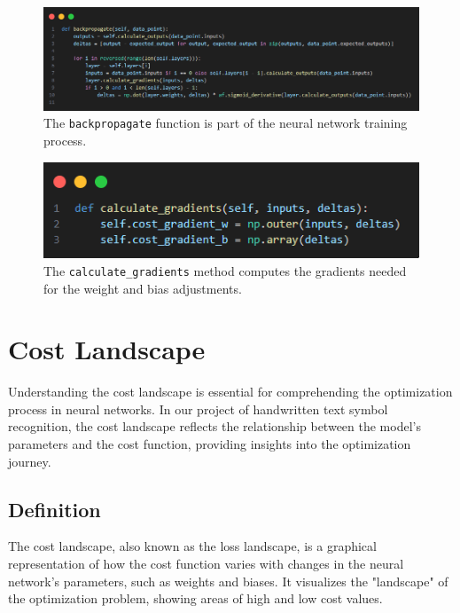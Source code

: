 \documentclass{article}
\begin{document}
\begin{figure}[ht]
    \centering 
    \includegraphics[width=1\textwidth]{images/backpropagate.png}
    \caption{The \texttt{backpropagate} function is part of the neural network training process.}
    \label{fig:backpropagation}
\end{figure}

\begin{figure}[ht]
    \centering 
    \includegraphics[width=1\textwidth]{images/calculate-gradients.png}
    \caption{The \texttt{calculate\_gradients} method computes the gradients needed for the weight and bias adjustments.}
    \label{fig:calculate_gradients}
\end{figure}
\clearpage
\newpage
\section{Cost Landscape}

Understanding the cost landscape is essential for comprehending the optimization process in neural networks. In our project of handwritten text symbol recognition, the cost landscape reflects the relationship between the model's parameters and the cost function, providing insights into the optimization journey.

\subsection{Definition}
The cost landscape, also known as the loss landscape, is a graphical representation of how the cost function varies with changes in the neural network's parameters, such as weights and biases. It visualizes the "landscape" of the optimization problem, showing areas of high and low cost values.
\end{document}
